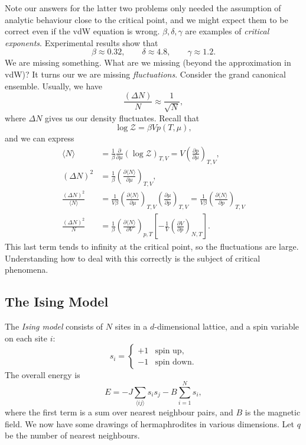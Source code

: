 \documentclass[12pt]{article}
\begin{document}
Note our answers for the latter two problems only needed the assumption of analytic behaviour close to the critical point, and we might expect them to be correct even if the vdW equation is wrong. $\beta, \delta, \gamma$ are examples of \emph{critical exponents}. Experimental results show that
\[
\beta \approx 0.32, \qquad \delta \approx 4.8, \qquad \gamma \approx 1.2.
\]
We are missing something. What are we missing (beyond the approximation in vdW)? It turns our we are missing \emph{fluctuations}. Consider the grand canonical ensemble. Usually, we have
\[
\frac{(\Delta N)}{N} \approx \frac{1}{\sqrt N},
\]
where $\Delta N$ gives us our density fluctuates. Recall that
\[
\log \mathcal{Z} = \beta V p(T, \mu),
\]
and we can express
\begin{align*}
	\langle N \rangle &= \frac{1}{\beta} \frac{\partial}{\partial \mu}(\log \mathcal{Z})_{T, V} = V \left( \frac{\partial p}{\partial \mu} \right)_{T, V}, \\
	(\Delta N)^2 &= \frac{1}{\beta} \left( \frac{\partial \langle N \rangle}{\partial \mu} \right)_{T, V}, \\
	\frac{(\Delta N)^2}{\langle N\rangle} &= \frac{1}{V \beta} \left( \frac{\partial \langle N \rangle}{ \partial \mu} \right)_{T, V} \left( \frac{\partial \mu}{\partial p} \right)_{T, V} = \frac{1}{V \beta} \left( \frac{\partial \langle N \rangle}{\partial p} \right)_{T, V} \\
	\frac{(\Delta N)^2}{N} &= \frac{1}{\beta} \left( \frac{\partial \langle N \rangle}{\partial V} \right)_{p, T} \left[ -\frac{1}{V} \left( \frac{\partial V}{\partial p}\right)_{N, T} \right].
\end{align*}
This last term tends to infinity at the critical point, so the fluctuations are large. Understanding how to deal with this correctly is the subject of critical phenomena.


\subsection{The Ising Model}
\label{sub:is_mod}

The \emph{Ising model} consists of $N$ sites in a $d$-dimensional lattice, and a spin variable on each site $i$:
\[
s_i = 
\begin{cases}
	+1 & \text{spin up},\\
	-1 & \text{spin down}.
\end{cases}
\]
The overall energy is
\[
E = -J \sum_{\langle i j \rangle} s_i s_j - B \sum_{i = 1}^N s_i,
\]
where the first term is a sum over nearest neighbour pairs, and $B$ is the magnetic field. We now have some drawings of hermaphrodites in various dimensions. Let $q$ be the number of nearest neighbours.
\end{document}
